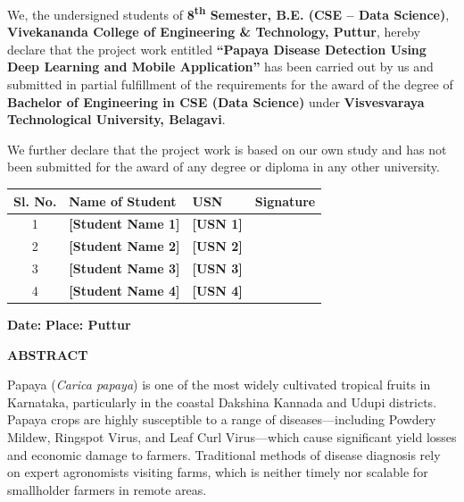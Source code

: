 \documentclass[12pt,a4paper]{report}
\begin{document}
We, the undersigned students of \textbf{8\textsuperscript{th} Semester, B.E. (CSE -- Data Science)}, \textbf{Vivekananda College of Engineering \& Technology, Puttur}, hereby declare that the project work entitled \textbf{``Papaya Disease Detection Using Deep Learning and Mobile Application''} has been carried out by us and submitted in partial fulfillment of the requirements for the award of the degree of \textbf{Bachelor of Engineering in CSE (Data Science)} under \textbf{Visvesvaraya Technological University, Belagavi}.

\vspace{0.3cm}
We further declare that the project work is based on our own study and has not been submitted for the award of any degree or diploma in any other university.

\vspace{1cm}
\begin{center}
\begin{tabular}{|c|p{4cm}|p{3cm}|p{3cm}|}
\hline
\textbf{Sl. No.} & \textbf{Name of Student} & \textbf{USN} & \textbf{Signature} \\
\hline
1 & \textbf{[Student Name 1]} & \textbf{[USN 1]} & \\[20pt]
\hline
2 & \textbf{[Student Name 2]} & \textbf{[USN 2]} & \\[20pt]
\hline
3 & \textbf{[Student Name 3]} & \textbf{[USN 3]} & \\[20pt]
\hline
4 & \textbf{[Student Name 4]} & \textbf{[USN 4]} & \\[20pt]
\hline
\end{tabular}
\end{center}

\vspace{1cm}
\noindent
\textbf{Date:} \underline{\hspace{3cm}} \hfill \textbf{Place: Puttur}

\newpage
\thispagestyle{plain}
\begin{center}
{\Large\bfseries ABSTRACT}
\end{center}
\vspace{0.5cm}

Papaya (\textit{Carica papaya}) is one of the most widely cultivated tropical fruits in Karnataka, particularly in the coastal Dakshina Kannada and Udupi districts. Papaya crops are highly susceptible to a range of diseases---including Powdery Mildew, Ringspot Virus, and Leaf Curl Virus---which cause significant yield losses and economic damage to farmers. Traditional methods of disease diagnosis rely on expert agronomists visiting farms, which is neither timely nor scalable for smallholder farmers in remote areas.
\end{document}
